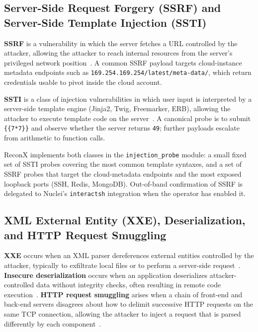 \subsection{Server-Side Request Forgery (SSRF) and Server-Side Template Injection (SSTI)}

\textbf{SSRF} is a vulnerability in which the server fetches a URL controlled by the attacker, allowing the attacker to reach internal resources from the server's privileged network position~\cite{owasp_ssrf}. A common SSRF payload targets cloud-instance metadata endpoints such as \texttt{169.254.169.254/latest/meta-data/}, which return credentials usable to pivot inside the cloud account.

\textbf{SSTI} is a class of injection vulnerabilities in which user input is interpreted by a server-side template engine (Jinja2, Twig, Freemarker, ERB), allowing the attacker to execute template code on the server~\cite{portswigger_ssti}. A canonical probe is to submit \verb|{{7*7}}| and observe whether the server returns \texttt{49}; further payloads escalate from arithmetic to function calls.

ReconX implements both classes in the \texttt{injection\_probe} module: a small fixed set of SSTI probes covering the most common template syntaxes, and a set of SSRF probes that target the cloud-metadata endpoints and the most exposed loopback ports (SSH, Redis, MongoDB). Out-of-band confirmation of SSRF is delegated to Nuclei's \texttt{interactsh} integration when the operator has enabled it.

\subsection{XML External Entity (XXE), Deserialization, and HTTP Request Smuggling}

\textbf{XXE} occurs when an XML parser dereferences external entities controlled by the attacker, typically to exfiltrate local files or to perform a server-side request~\cite{owasp_xxe}. \textbf{Insecure deserialization} occurs when an application deserializes attacker-controlled data without integrity checks, often resulting in remote code execution~\cite{owasp_deserialization}. \textbf{HTTP request smuggling} arises when a chain of front-end and back-end servers disagrees about how to delimit successive HTTP requests on the same TCP connection, allowing the attacker to inject a request that is parsed differently by each component~\cite{portswigger_smuggling}.

